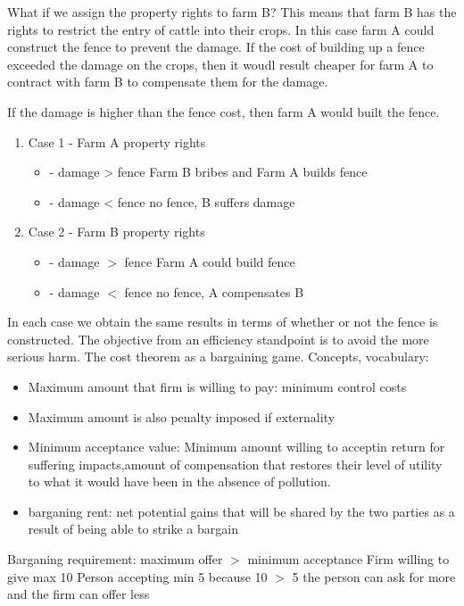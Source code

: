 \documentclass[11pt]{article} %
\begin{document}
What if we assign the property rights to farm B? This means that farm B has the rights to restrict the entry of cattle into their crops.
In this case farm A could construct the fence to prevent the damage. If the cost of building up a fence exceeded the damage on the crops, then it woudl result cheaper for farm A to contract with farm B to compensate them for the damage.

If the damage is higher than the fence cost, then farm A would built the fence.

\begin{enumerate}
\item Case 1 - Farm A property rights
\begin{itemize}
	\item 	- damage > fence Farm B bribes and Farm A builds fence
	\item - damage < fence no fence, B suffers damage
	\end{itemize}
\item Case 2 - Farm B property rights
\begin{itemize}
	\item 	- damage $>$ fence Farm A could build fence
	\item	- damage $<$ fence no fence, A compensates B
	\end{itemize}
\end{enumerate}
In each case we obtain the same results in terms of whether or not the fence is constructed.
The objective from an efficiency standpoint is to avoid the more serious harm.
The cost theorem as a bargaining game.
Concepts, vocabulary:
\begin{itemize}
	\item 	Maximum amount that firm is willing to pay: minimum control costs
	\item 	Maximum amount is also penalty imposed if externality
	\item 	Minimum acceptance value: Minimum amount willing to acceptin return for suffering impacts,amount of compensation that restores their level of utility to what it would have been in the absence of pollution.
	\item 	barganing rent: net potential gains that will be shared by the two parties as a result of being able to strike a bargain
\end{itemize}

Barganing requirement: maximum offer $>$ minimum acceptance
Firm willing to give max 10
Person accepting min 5
because 10 $>$ 5 the person can ask for more and the firm can offer less
\end{document}
